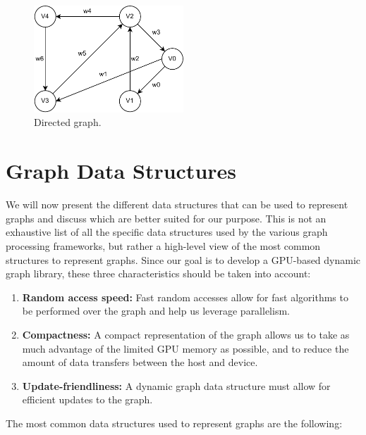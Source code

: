


\begin{figure}[tbp]
  \centering
    \includegraphics[width=0.5\textwidth]{Chapters/Figures/Images/graph_a.pdf}
    \caption{Directed graph.}
    \label{fig:graph-a}
\end{figure}

    \section{Graph Data Structures} \label{graph_data_structures}
    \label{sec:graph_data_structures}
    
    We will now present the different data structures that can be used to represent graphs and discuss which are better suited for our purpose. This is not an exhaustive list of all the specific data structures used by the various graph processing frameworks, but rather a high-level view of the most common structures to represent graphs. Since our goal is to develop a \gls{GPU}-based dynamic graph library, these three characteristics should be taken into account:
    
    \begin{enumerate}
        \item \textbf{Random access speed:} Fast random accesses allow for fast algorithms to be performed over the graph and help us leverage parallelism. 
        \item \textbf{Compactness:} A compact representation of the graph allows us to take as much advantage of the limited \gls{GPU} memory as possible, and to reduce the amount of data transfers between the host and device.
        \item \textbf{Update-friendliness:} A dynamic graph data structure must allow for efficient updates to the graph.
    \end{enumerate}

    The most common data structures used to represent graphs are the following:


